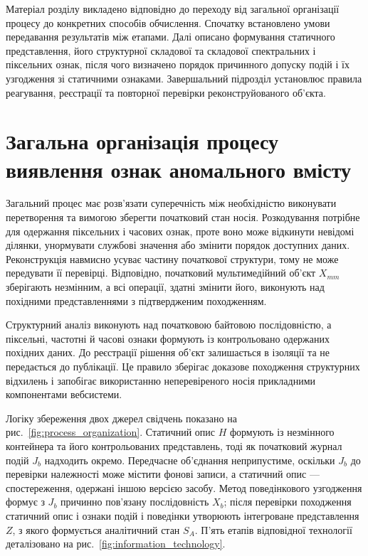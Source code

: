 Матеріал розділу викладено відповідно до переходу від загальної організації процесу до конкретних способів обчислення. Спочатку встановлено умови передавання результатів між етапами. Далі описано формування статичного представлення, його структурної складової та складової спектральних і піксельних ознак, після чого визначено порядок причинного допуску подій і їх узгодження зі статичними ознаками. Завершальний підрозділ установлює правила реагування, реєстрації та повторної перевірки реконструйованого об’єкта.

\section{Загальна організація процесу виявлення ознак аномального вмісту}
\label{sec:process_organization}

Загальний процес має розв’язати суперечність між необхідністю виконувати перетворення та вимогою зберегти початковий стан носія. Розкодування потрібне для одержання піксельних і часових ознак, проте воно може відкинути невідомі ділянки, унормувати службові значення або змінити порядок доступних даних. Реконструкція навмисно усуває частину початкової структури, тому не може передувати її перевірці. Відповідно, початковий мультимедійний об’єкт $X_{mm}$ зберігають незмінним, а всі операції, здатні змінити його, виконують над похідними представленнями з підтвердженим походженням.

Структурний аналіз виконують над початковою байтовою послідовністю, а піксельні, частотні й часові ознаки формують із контрольовано одержаних похідних даних. До реєстрації рішення об’єкт залишається в ізоляції та не передається до публікації. Це правило зберігає доказове походження структурних відхилень і запобігає використанню неперевіреного носія прикладними компонентами вебсистеми.

Логіку збереження двох джерел свідчень показано на рис.~\ref{fig:process_organization}. Статичний опис $H$ формують із незмінного контейнера та його контрольованих представлень, тоді як початковий журнал подій $J_b$ надходить окремо. Передчасне об’єднання неприпустиме, оскільки $J_b$ до перевірки належності може містити фонові записи, а статичний опис --- спостереження, одержані іншою версією засобу. Метод поведінкового узгодження формує з $J_b$ причинно пов’язану послідовність $X_b$; після перевірки походження статичний опис і ознаки подій і поведінки утворюють інтегроване представлення $Z$, з якого формується аналітичний стан $S_A$. П’ять етапів відповідної технології деталізовано на рис.~\ref{fig:information_technology}.

